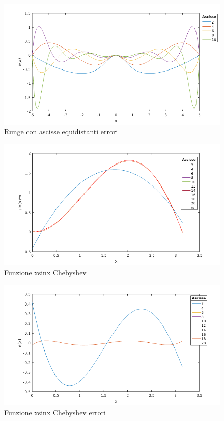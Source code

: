 \begin{figure}[h]
\caption{Runge con ascisse equidistanti errori}
\label{RungeEqErr}
\includegraphics[width=\textwidth]{plot/Runge_equi_err}
\end{figure}
\begin{figure}[h]
\caption{Funzione xsinx Chebyshev}
\label{SinChe}
\includegraphics[width=\textwidth]{plot/Sin_cheb}
\end{figure}
\begin{figure}[h]
\caption{Funzione xsinx Chebyshev errori}
\label{SinCheErr}
\includegraphics[width=\textwidth]{plot/Sin_cheb_Err}
\end{figure}

